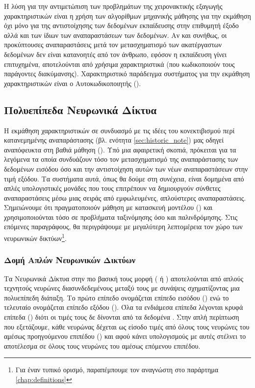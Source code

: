 Η λύση για την αντιμετώπιση των προβλημάτων της χειρονακτικής εξαγωγής χαρακτηριστικών είναι η χρήση των αλγορίθμων μηχανικής μάθησης για την εκμάθηση όχι μόνο για της αντιστοίχησης των δεδομένων εκπαίδευσης στην επιθυμητή έξοδο αλλά και των ίδιων των αναπαραστάσεων των δεδομένων. Αν και συνήθως, οι προκύπτουσες αναπαραστάσεις μετά τον μετασχηματισμό των ακατέργαστων δεδομένων δεν είναι κατανοητές από τον άνθρωπο, εφόσον η εκπαίδευση γίνει επιτυχημένα, αποτελούνται από χρήσιμα χαρακτηριστικά (που κωδικοποιούν τους παράγοντες διακύμανσης).
Χαρακτηριστικό παράδειγμα συστήματος για την εκμάθηση χαρακτηριστικών είναι ο Αυτοκωδικοποιητής ().

\subsection{Πολυεπίπεδα Νευρωνικά Δίκτυα}

Η εκμάθηση χαρακτηριστικών σε συνδυασμό με τις ιδέες του κονεκτιβισμού περί κατανεμημένης αναπαράστασης (βλ. ενότητα \ref{sec:historic_note}) μας οδηγεί αναπόφευκτα στη βαθιά μάθηση (). Υπό μια αφαιρετική σκοπιά, πρόκειται για τα λεγόμενα  τα οποία συνδυάζουν τόσο τον μετασχηματισμό της αναπαράστασης των δεδομένων εισόδου όσο και την αντιστοίχηση αυτών των νέων αναπαραστάσεων στην τιμή εξόδου. Τα συστήματα αυτά, όπως θα δούμε στη συνέχεια, είναι δομημένα από απλές υπολογιστικές μονάδες που τους επιτρέπουν να δημιουργούν σύνθετες αναπαραστάσεις μέσω μιας σειράς από εμφωλευμένες, απλούστερες αναπαραστάσεις. Σημειώνουμε ότι πραγματοποιούν μάθηση με κατασκευή μοντέλου () και χρησιμοποιούνται τόσο σε προβλήματα ταξινόμησης όσο και παλινδρόμησης. Στις επόμενες παραγράφους, θα περιγράψουμε με μεγαλύτερη λεπτομέρεια τον χώρο των νευρωνικών δικτύων\footnote{Για έναν τυπικό ορισμό, παραπέμπουμε τον αναγνώστη στο παράρτημα \ref{chap:definitions}}.

\subsubsection{Δομή Απλών Νευρωνικών Δικτύων}
\label{sec:_vanilla_nn}
Τα Νευρωνικά Δίκτυα στην πιο βασική τους μορφή ( ή ) αποτελούνται από απλούς τεχνητούς νευρώνες διασυνδεδεμένους μεταξύ τους με συνάψεις σχηματίζοντας μια πολυεπίπεδη διάταξη. Το πρώτο επίπεδο ονομάζεται επίπεδο εισόδου () ενώ το τελευταίο ονομάζεται επίπεδο εξόδου (). Όλα τα ενδιάμεσα επίπεδα λέγονται κρυφά επίπεδα () διότι οι τιμές τους δε δίνονται από τα δεδομένα \cite{goodfellow2016deep}. Στην απλή περίπτωση που εξετάζουμε, κάθε νευρώνας δέχεται ως είσοδο τιμές από όλους τους νευρώνες του αμέσως προηγούμενου επιπέδου () και αφού κάνει υπολογισμούς με αυτές στέλνει το αποτέλεσμα σε όλους τους νευρώνες του αμέσως επόμενου επιπέδου.
\par
                  
